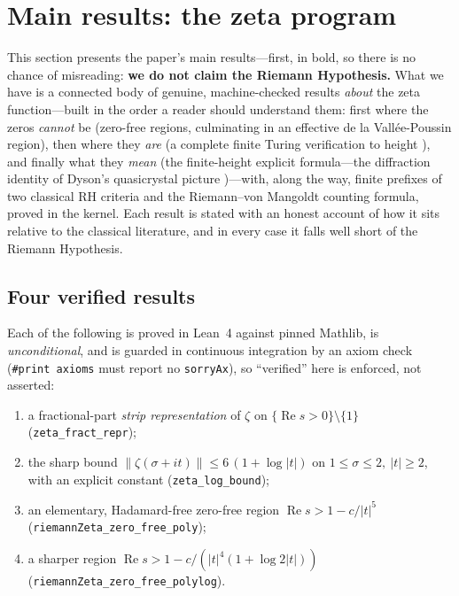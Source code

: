\section{Main results: the zeta program}
\label{sec:rh}

This section presents the paper's main results---first, in bold, so there is no
chance of misreading: \textbf{we do not claim the Riemann Hypothesis.} What we have is a connected body of genuine,
machine-checked results \emph{about} the zeta function---built in the order a
reader should understand them: first where the zeros \emph{cannot} be (zero-free
regions, culminating in an effective de la Vallée-Poussin region), then where
they \emph{are} (a complete finite Turing verification to height \ladderHeight{}), and
finally what they \emph{mean} (the finite-height explicit formula---the
diffraction identity of Dyson's quasicrystal picture \cite{dyson2009})---with,
along the way, finite prefixes of two classical RH criteria and the
Riemann--von Mangoldt counting formula, proved in the kernel.
Each
result is stated with an honest account of how it sits relative to the classical
literature, and in every case it falls well short of the Riemann Hypothesis.

\subsection{Four verified results}

Each of the following is proved in Lean~4 against pinned Mathlib, is
\emph{unconditional}, and is guarded in continuous integration by an axiom check
(\texttt{\#print axioms} must report no \texttt{sorryAx}), so ``verified'' here is
enforced, not asserted:

\begin{enumerate}
  \item a fractional-part \emph{strip representation} of $\zeta$ on
    $\{\operatorname{Re} s > 0\} \setminus \{1\}$ (\texttt{zeta\_fract\_repr});
  \item the sharp bound $\lVert \zeta(\sigma+it) \rVert \le 6\,(1 + \log|t|)$ on
    $1 \le \sigma \le 2,\ |t| \ge 2$, with an explicit constant
    (\texttt{zeta\_log\_bound});
  \item an elementary, Hadamard-free zero-free region
    $\operatorname{Re} s > 1 - c/|t|^5$ (\texttt{riemannZeta\_zero\_free\allowbreak\_poly});
  \item a sharper region $\operatorname{Re} s > 1 - c/\!\left(|t|^4 (1 + \log 2|t|)\right)$
    (\texttt{riemannZeta\_zero\_free\allowbreak\_polylog}).
\end{enumerate}

